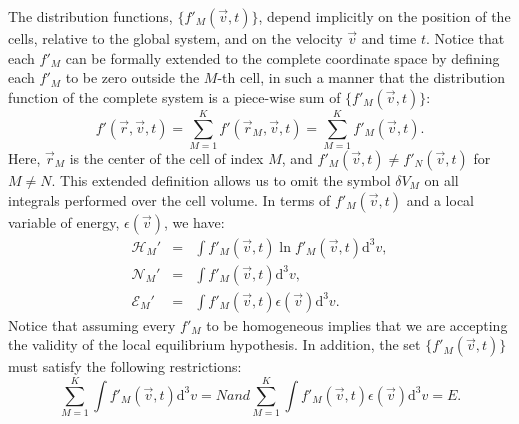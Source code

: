 The distribution functions, $\{f'_M(\vec{v},t)\}$, depend implicitly on the position of the cells,
relative to the global system, and on the velocity
$\vec{v}$ and time $t$. Notice that each $f'_M$ can be formally extended to the complete coordinate space
by defining each $f'_M$ to be zero outside the $M$-th cell, in such a manner that
the distribution function of the complete system is a piece-wise sum
of $\{f'_M(\vec v,t)\}$:
%
\begin{equation}
   f'(\vec r,\vec v,t)=\sum_{M=1}^Kf'(\vec r_M,\vec v,t)=\sum_{M=1}^Kf'_M(\vec v,t).
\end{equation}
%
Here, $\vec r_M$ is the center of the cell of index $M$, and $f'_M(\vec v,t)\neq f'_N(\vec v,t)$
for $M\neq N$. This extended definition
allows us to omit the symbol $\delta V_M$ on all integrals performed over the cell volume.
In terms of $f'_M(\vec{v},t)$ and a local variable of energy, $\epsilon(\vec{v})$, we have:
%
\begin{subequations}\label{eq:cellrestrictions}
\begin{eqnarray}
    \mathcal{H}_M' & = &  \int f'_M(\vec{v},t) \ln f'_{M}(\vec{v},t)
      \mathrm{d}^{3}v \label{eq:Hcell},\\
    \mathcal{N}_M' & = & \int f'_{M}(\vec{v} ,t) \mathrm{d}^{3}v,\label{eq:Ncell}\\
    \mathcal{E}_M' & = & \int f'_{M}(\vec{v},t)\epsilon(\vec{v}) \mathrm{d}^{3}v\label{eq:Ecell}.
\end{eqnarray}
\end{subequations}
%
Notice that assuming every $f'_M$ to be homogeneous implies that we are accepting the validity of the
local equilibrium hypothesis. In addition, the set $\{f'_{M}(\vec{v},t)\}$ must satisfy the following restrictions:
%
\begin{subequations}\label{eq:micro}
\begin{equation}\label{eq:micron}
    \sum_{M=1}^{K}\int f'_M(\vec{v},t)\mathrm{d}^3v =N
\end{equation}
and
\begin{equation}\label{eq:microe}
    \sum_{M=1}^{K}\int f'_M(\vec{v},t)\epsilon(\vec{v})\mathrm{d}^3v=E.
\end{equation}
\end{subequations}
%

